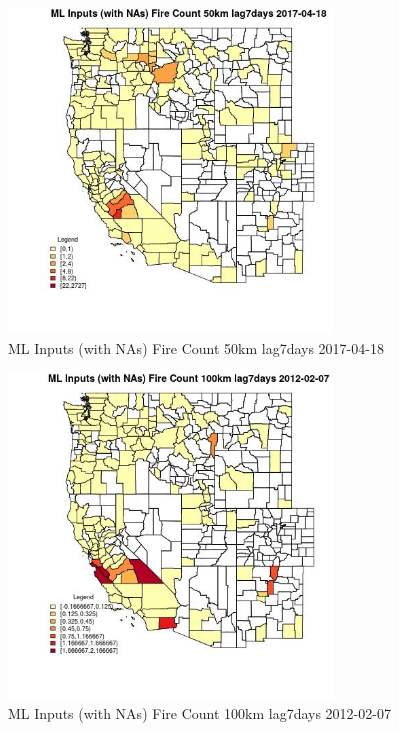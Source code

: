 \begin{figure} 
\centering  
\includegraphics[width=0.77\textwidth]{Code_Outputs/Report_ML_input_PM25_Step4_part_f_de_duplicated_aves_prioritize_24hr_obswNAs_CountyFire_Count_50km_lag7daysMean2017-04-18.jpg} 
\caption{\label{fig:Report_ML_input_PM25_Step4_part_f_de_duplicated_aves_prioritize_24hr_obswNAsCountyFire_Count_50km_lag7daysMean2017-04-18}ML Inputs (with NAs) Fire Count 50km lag7days 2017-04-18} 
\end{figure} 
 

\clearpage 

\begin{figure} 
\centering  
\includegraphics[width=0.77\textwidth]{Code_Outputs/Report_ML_input_PM25_Step4_part_f_de_duplicated_aves_prioritize_24hr_obswNAs_CountyFire_Count_100km_lag7daysMean2012-02-07.jpg} 
\caption{\label{fig:Report_ML_input_PM25_Step4_part_f_de_duplicated_aves_prioritize_24hr_obswNAsCountyFire_Count_100km_lag7daysMean2012-02-07}ML Inputs (with NAs) Fire Count 100km lag7days 2012-02-07} 
\end{figure} 
 

